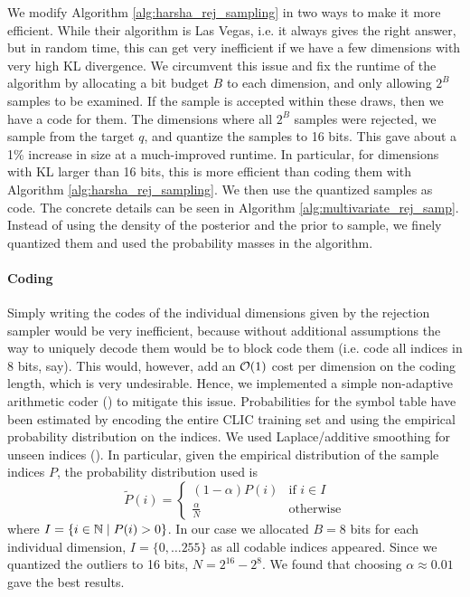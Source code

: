\par
We modify Algorithm \ref{alg:harsha_rej_sampling} in two ways to make it more
efficient. While their algorithm is Las Vegas, i.e. it always gives the right
answer, but in random time, this can get very inefficient if we have a few
dimensions with very high KL divergence. We circumvent this issue and fix the
runtime of the algorithm by allocating a bit budget $B$ to each dimension, and
only allowing $2^B$ samples to be examined. If the sample is accepted within
these draws, then we have a code for them. The dimensions where all $2^B$ samples were
rejected, we sample from the target $q$, and quantize the samples to 16 bits.
This gave about a 1\% increase in size at a much-improved runtime. In
particular, for dimensions with KL larger than 16 bits, this is more
efficient than coding them with Algorithm \ref{alg:harsha_rej_sampling}.
We then use the quantized samples as code. The concrete details can be seen in Algorithm
\ref{alg:multivariate_rej_samp}. Instead of using the density of the posterior
and the prior to sample, we finely quantized them and used the probability
masses in the algorithm.


\paragraph{Coding}
Simply writing the codes of the individual dimensions given by the rejection
sampler would be very inefficient, because without additional assumptions the
way to uniquely decode them would be to block code them (i.e. code all indices
in 8 bits, say). This would, however, add an $\mathcal{O}(1)$ cost per dimension on
the coding length, which is very undesirable. Hence, we implemented a simple
non-adaptive arithmetic coder (\cite{rissanen1981universal}) to mitigate this issue.
Probabilities for the symbol table have been estimated by encoding the entire
CLIC training set and using the empirical probability distribution on the
indices. We used Laplace/additive smoothing for unseen indices (\cite{chen1999empirical}).
In particular, given the empirical distribution of the sample indices $P$,
the probability distribution used is
\[
  \tilde{P}(i) = \begin{cases}
    (1 - \alpha)P(i) & \text{if } i \in I \\
    \frac{\alpha}{N} & \text{otherwise}
    \end{cases}
\]
where $I = \{i \in \mathbb{N} \mid P(i) > 0\}$.
In our case we allocated $B = 8$ bits for each individual dimension,
$I = \{0, \hdots 255\}$ as all codable indices appeared. Since we quantized the
outliers to 16 bits, $N = 2^{16} - 2^{8}$. We found that choosing $\alpha
\approx 0.01$ gave the best results.


